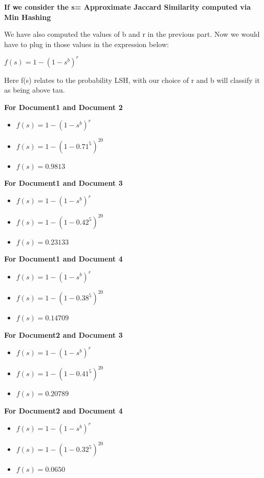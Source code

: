 \documentclass[11pt]{article}
\begin{document}
\begin{itemize}
\textbf{If we consider the s= Approximate Jaccard Similarity computed via Min Hashing}

 We have also computed the values of b and r in the previous part. Now we would have to plug in those values in the expression below:

\begin{center}
$f(s)=1-(1-s^{b})^{r}$
\end{center}

Here f(s) relates to the probability LSH, with our choice of r and b will classify it as being above tau. 

\textbf{For Document1 and Document 2}
\begin{itemize}
	\item[] $f(s)=1-(1-s^{b})^{r}$
	\item[] $f(s)=1-(1-0.71^{5})^{20}$
	\item[] $\boxed{f(s)=0.9813}$
\end{itemize}

\textbf{For Document1 and Document 3}
\begin{itemize}
	\item[] $f(s)=1-(1-s^{b})^{r}$
	\item[] $f(s)=1-(1-0.42^{5})^{20}$
	\item[] $\boxed{f(s)=0.23133}$\\
\end{itemize}

\textbf{For Document1 and Document 4}
\begin{itemize}
	\item[] $f(s)=1-(1-s^{b})^{r}$
	\item[] $f(s)=1-(1-0.38^{5})^{20}$
	\item[] $\boxed{f(s)=0.14709}$\\
\end{itemize}

\textbf{For Document2 and Document 3}
\begin{itemize}
	\item[] $f(s)=1-(1-s^{b})^{r}$
	\item[] $f(s)=1-(1-0.41^{5})^{20}$
	\item[] $\boxed{f(s)=0.20789}$\\
\end{itemize}



\textbf{For Document2 and Document 4}
\begin{itemize}
	\item[] $f(s)=1-(1-s^{b})^{r}$
	\item[] $f(s)=1-(1-0.32^{5})^{20}$
	\item[] $\boxed{f(s)=0.0650}$\\
\end{itemize}


\end{itemize}
\end{document}
